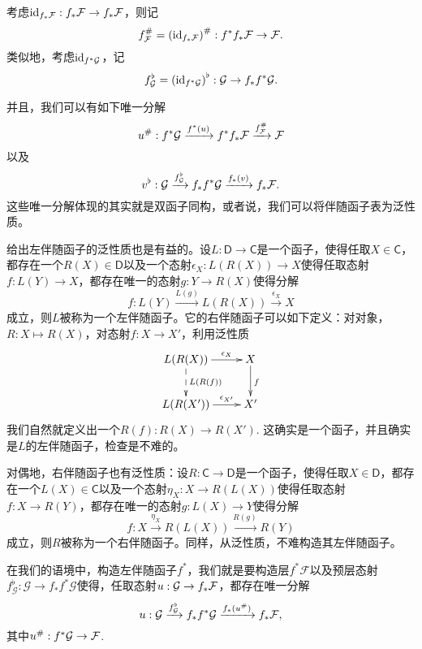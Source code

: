 考虑$\operatorname{id}_{f_*\mathcal{F}}:f_*\mathcal{F}\to f_*\mathcal{F}$，则记
\[
	f^\#_{\mathcal{F}}=\left(\operatorname{id}_{f_*\mathcal{F}}\right)^\#: f^*f_*\mathcal{F} \to \mathcal{F}.
\]
类似地，考虑$\operatorname{id}_{f^*\mathcal{G}}$，记
\[
	f^\flat_{\mathcal{G}} =\left(\operatorname{id}_{f^*\mathcal{G}}\right)^\flat : \mathcal{G} \to f_*f^*\mathcal{G}.
\]

并且，我们可以有如下唯一分解
\[
	u^\# : f^*\mathcal{G} \xrightarrow{f^*(u)} f^*f_*\mathcal{F} \xrightarrow{f^\#_{\mathcal{F}}}\mathcal{F}
\]
以及
\[
	v^\flat : \mathcal{G} \xrightarrow{f^\flat_{\mathcal{G}}} f_*f^*\mathcal{G}\xrightarrow{f_*(v)} f_*\mathcal{F}.
\]
这些唯一分解体现的其实就是双函子同构，或者说，我们可以将伴随函子表为泛性质。

\begin{para}[伴随函子的泛性质]\label{adjoint_functor}
给出左伴随函子的泛性质也是有益的。设$L:\mathsf D\to \mathsf C$是一个函子，使得任取$X\in \mathsf C$，都存在一个$R(X)\in \mathsf D$以及一个态射$\epsilon_X:L(R(X))\to X$使得任取态射$f:L(Y)\to X$，都存在唯一的态射$g:Y\to R(X)$使得分解
\[
	f:L(Y)\xrightarrow{L(g)}L(R(X))\xrightarrow{\epsilon_X}X
\]
成立，则$L$被称为一个左伴随函子。它的右伴随函子可以如下定义：对对象，$R:X\mapsto R(X)$，对态射$f:X\to X'$，利用泛性质
\[
	\xymatrix{
		L(R(X))\ar[r]^-{\epsilon_X}\ar@{-->}[d]^{L(R(f))}&X\ar[d]^f\\
		L(R(X'))\ar[r]^-{\epsilon_{X'}}&X'
	}
\]
我们自然就定义出一个$R(f):R(X)\to R(X')$. 这确实是一个函子，并且确实是$L$的左伴随函子，检查是不难的。

对偶地，右伴随函子也有泛性质：设$R:\mathsf C\to \mathsf D$是一个函子，使得任取$X\in \mathsf D$，都存在一个$L(X)\in \mathsf C$以及一个态射$\eta_X:X\to R(L(X))$使得任取态射$f:X\to R(Y)$，都存在唯一的态射$g:L(X)\to Y$使得分解
\[
	f:X\xrightarrow{\eta_X}R(L(X))\xrightarrow{R(g)}R(Y)
\]
成立，则$R$被称为一个右伴随函子。同样，从泛性质，不难构造其左伴随函子。
\end{para}

在我们的语境中，构造左伴随函子$f^*$，我们就是要构造层$f^*\mathcal F$以及预层态射$f^\flat_{\mathcal G}:\mathcal G\to f_*f^*\mathcal G$使得，任取态射$u:\mathcal{G} \to f_*\mathcal{F}$，都存在唯一分解
\[
	u : \mathcal{G} \xrightarrow{f^\flat_{\mathcal{G}}} f_*f^*\mathcal{G}\xrightarrow{f_*(u^\#)} f_*\mathcal{F},
\]
其中$u^\#:f^*\mathcal G\to \mathcal{F}$.



